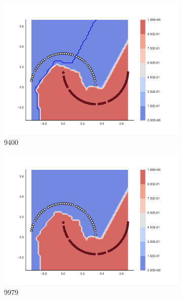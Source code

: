 \begin{figure}[h]
\begin{subfigure}[b]{0.09\textwidth}
    \includegraphics[clip, trim=2.35cm 1.75cm 4.5cm 0cm,width=\textwidth]{img/convergence/9400.pdf}
    \caption{9400}
    \label{fig:convergence_9400}
\end{subfigure}
%
\begin{subfigure}[b]{0.09\textwidth}
    \includegraphics[clip, trim=2.35cm 1.75cm 4.5cm 0cm,width=\textwidth]{img/convergence/9979.pdf}
    \caption{9979}
    \label{fig:convergence_9979}
\end{subfigure}
%
\begin{subfigure}[b]{0.09\textwidth}

\end{subfigure}
\end{figure}
